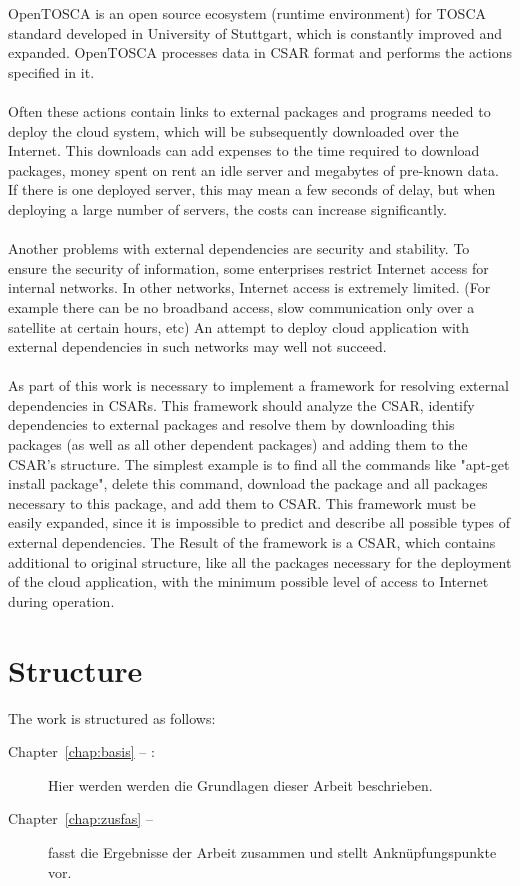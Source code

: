 OpenTOSCA \cite*{OpenTOSCA} is an open source ecosystem (runtime environment) for TOSCA standard developed in University of Stuttgart, which is constantly improved and expanded.
OpenTOSCA processes data in CSAR format and performs the actions specified in it.\\\\
Often these actions contain links to external packages and programs needed to deploy the cloud system, which will be subsequently downloaded over the Internet.
This downloads can add expenses to the time required to download packages, money spent on rent an idle server and megabytes of pre-known data.
If there is one deployed server, this may mean a few seconds of delay, but when deploying a large number of servers, the costs can increase significantly.\\\\
Another problems with external dependencies are security and stability.
To ensure the security of information, some enterprises restrict Internet access for internal networks.
In other networks, Internet access is extremely limited.
(For example there can be no broadband access, slow communication only over a satellite at certain hours, etc)
An attempt to deploy cloud application with external dependencies in such networks may well not succeed. \\\\
As part of this work is necessary to implement a framework for resolving external dependencies in CSARs.
This framework should analyze the CSAR, identify dependencies to external packages and resolve them by downloading this packages (as well as all other dependent packages) and adding them to the CSAR's structure.
The simplest example is to find all the commands like "apt-get install package", delete this command, download the package and all packages necessary to this package, and add them to CSAR.
This framework must be easily expanded, since it is impossible to predict and describe all possible types of external dependencies.
The Result of the framework is a CSAR, which contains additional to original structure, like all the packages necessary for the deployment of the cloud application, with the minimum possible level of access to Internet during operation.

\section*{Structure}
The work is structured as follows:
\begin{description}
\item[Chapter~\ref{chap:basis} -- :] Hier werden werden die Grundlagen dieser Arbeit beschrieben.
\item[Chapter~\ref{chap:zusfas} -- ] fasst die Ergebnisse der Arbeit zusammen und stellt Anknüpfungspunkte vor.
\end{description}
